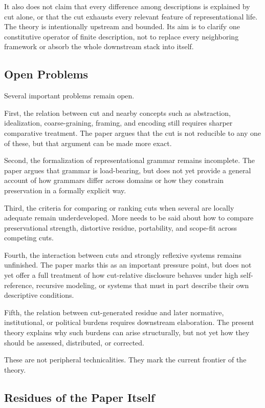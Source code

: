 \documentclass[11pt]{article}
\begin{document}
It also does not claim that every difference among descriptions is explained by cut alone, or that the cut exhausts every relevant feature of representational life. The theory is intentionally upstream and bounded. Its aim is to clarify one constitutive operator of finite description, not to replace every neighboring framework or absorb the whole downstream stack into itself.

\subsection{Open Problems}

Several important problems remain open.

First, the relation between cut and nearby concepts such as abstraction, idealization, coarse-graining, framing, and encoding still requires sharper comparative treatment. The paper argues that the cut is not reducible to any one of these, but that argument can be made more exact.

Second, the formalization of representational grammar remains incomplete. The paper argues that grammar is load-bearing, but does not yet provide a general account of how grammars differ across domains or how they constrain preservation in a formally explicit way.

Third, the criteria for comparing or ranking cuts when several are locally adequate remain underdeveloped. More needs to be said about how to compare preservational strength, distortive residue, portability, and scope-fit across competing cuts.

Fourth, the interaction between cuts and strongly reflexive systems remains unfinished. The paper marks this as an important pressure point, but does not yet offer a full treatment of how cut-relative disclosure behaves under high self-reference, recursive modeling, or systems that must in part describe their own descriptive conditions.

Fifth, the relation between cut-generated residue and later normative, institutional, or political burdens requires downstream elaboration. The present theory explains why such burdens can arise structurally, but not yet how they should be assessed, distributed, or corrected.

These are not peripheral technicalities. They mark the current frontier of the theory.

\subsection{Residues of the Paper Itself}
\end{document}
